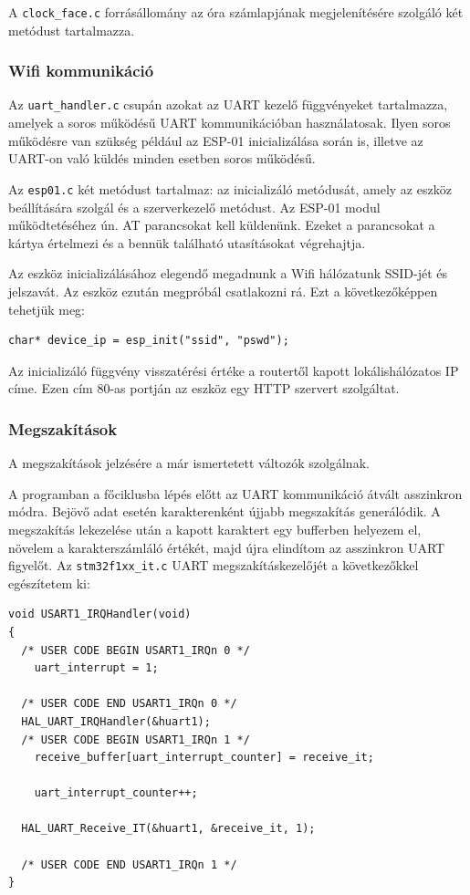 \documentclass[a4paper, 12pt]{article}
\begin{document}
\bigskip

A \texttt{clock\_face.c} forrásállomány az óra számlapjának megjelenítésére szolgáló két metódust tartalmazza.

\subsubsection{Wifi kommunikáció}

Az \texttt{uart\_handler.c} csupán azokat az UART kezelő függvényeket tartalmazza, amelyek a soros működésű UART kommunikációban használatosak. Ilyen soros működésre van szükség például az ESP-01 inicializálása során is, illetve az UART-on való küldés minden esetben soros működésű.

\bigskip

Az \texttt{esp01.c} két metódust tartalmaz: az inicializáló metódusát, amely az eszköz beállítására szolgál és a szerverkezelő metódust.
Az ESP-01 modul működtetéséhez ún. AT parancsokat kell küldenünk. Ezeket a parancsokat a kártya értelmezi és a bennük található utasításokat végrehajtja.

Az eszköz inicializálásához elegendő megadnunk a Wifi hálózatunk SSID-jét és jelszavát. Az eszköz ezután megpróbál csatlakozni rá. Ezt a következőképpen tehetjük meg:
\begin{lstlisting}[style=CStyle]
char* device_ip = esp_init("ssid", "pswd");
\end{lstlisting}
Az inicializáló függvény visszatérési értéke a routertől kapott lokálishálózatos IP címe. Ezen cím 80-as portján az eszköz egy HTTP szervert szolgáltat.

\subsubsection{Megszakítások}

A megszakítások jelzésére a már ismertetett változók szolgálnak.

A programban a főciklusba lépés előtt az UART kommunikáció átvált asszinkron módra. Bejövő adat esetén karakterenként újjabb megszakítás generálódik. A megszakítás lekezelése után a kapott karaktert egy bufferben helyezem el, növelem a karakterszámláló értékét, majd újra elindítom az asszinkron UART figyelőt.
Az \texttt{stm32f1xx\_it.c} UART megszakításkezelőjét a következőkkel egészítetem ki: 
\begin{lstlisting}[style=CStyle]
void USART1_IRQHandler(void)
{
  /* USER CODE BEGIN USART1_IRQn 0 */
	uart_interrupt = 1;

  /* USER CODE END USART1_IRQn 0 */
  HAL_UART_IRQHandler(&huart1);
  /* USER CODE BEGIN USART1_IRQn 1 */
	receive_buffer[uart_interrupt_counter] = receive_it;

	uart_interrupt_counter++;

  HAL_UART_Receive_IT(&huart1, &receive_it, 1);

  /* USER CODE END USART1_IRQn 1 */
}
\end{lstlisting}
\end{document}
